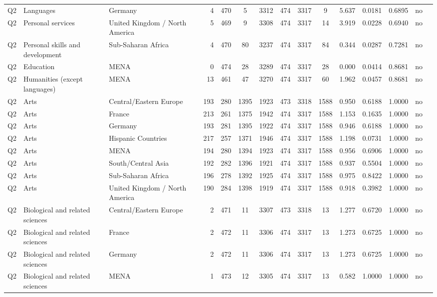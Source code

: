 \begin{longtable}{lllrcccccccccll}
Q2 & Languages & Germany & 4 & 470 & 5 & 3312 & 474 & 3317 & 9 & 5.637 & 0.0181 & 0.6895 & no \\
Q2 & Personal services & United Kingdom / North America & 5 & 469 & 9 & 3308 & 474 & 3317 & 14 & 3.919 & 0.0228 & 0.6940 & no \\
Q2 & Personal skills and development & Sub-Saharan Africa & 4 & 470 & 80 & 3237 & 474 & 3317 & 84 & 0.344 & 0.0287 & 0.7281 & no \\
Q2 & Education & MENA & 0 & 474 & 28 & 3289 & 474 & 3317 & 28 & 0.000 & 0.0414 & 0.8681 & no \\
Q2 & Humanities (except languages) & MENA & 13 & 461 & 47 & 3270 & 474 & 3317 & 60 & 1.962 & 0.0457 & 0.8681 & no \\
Q2 & Arts & Central/Eastern Europe & 193 & 280 & 1395 & 1923 & 473 & 3318 & 1588 & 0.950 & 0.6188 & 1.0000 & no \\
Q2 & Arts & France & 213 & 261 & 1375 & 1942 & 474 & 3317 & 1588 & 1.153 & 0.1635 & 1.0000 & no \\
Q2 & Arts & Germany & 193 & 281 & 1395 & 1922 & 474 & 3317 & 1588 & 0.946 & 0.6188 & 1.0000 & no \\
Q2 & Arts & Hispanic Countries & 217 & 257 & 1371 & 1946 & 474 & 3317 & 1588 & 1.198 & 0.0731 & 1.0000 & no \\
Q2 & Arts & MENA & 194 & 280 & 1394 & 1923 & 474 & 3317 & 1588 & 0.956 & 0.6906 & 1.0000 & no \\
Q2 & Arts & South/Central Asia & 192 & 282 & 1396 & 1921 & 474 & 3317 & 1588 & 0.937 & 0.5504 & 1.0000 & no \\
Q2 & Arts & Sub-Saharan Africa & 196 & 278 & 1392 & 1925 & 474 & 3317 & 1588 & 0.975 & 0.8422 & 1.0000 & no \\
Q2 & Arts & United Kingdom / North America & 190 & 284 & 1398 & 1919 & 474 & 3317 & 1588 & 0.918 & 0.3982 & 1.0000 & no \\
Q2 & Biological and related sciences & Central/Eastern Europe & 2 & 471 & 11 & 3307 & 473 & 3318 & 13 & 1.277 & 0.6720 & 1.0000 & no \\
Q2 & Biological and related sciences & France & 2 & 472 & 11 & 3306 & 474 & 3317 & 13 & 1.273 & 0.6725 & 1.0000 & no \\
Q2 & Biological and related sciences & Germany & 2 & 472 & 11 & 3306 & 474 & 3317 & 13 & 1.273 & 0.6725 & 1.0000 & no \\
Q2 & Biological and related sciences & MENA & 1 & 473 & 12 & 3305 & 474 & 3317 & 13 & 0.582 & 1.0000 & 1.0000 & no \\

\end{longtable}
